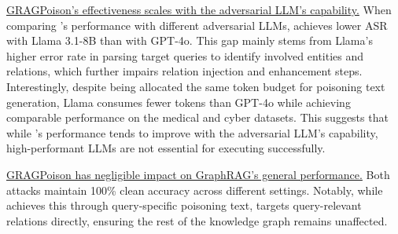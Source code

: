 


\vspace{2pt}
 \ul{GRAGPoison's effectiveness scales with the adversarial LLM's capability.}
When comparing \attack's performance with different adversarial LLMs, \attack achieves lower ASR with Llama 3.1-8B than with GPT-4o. This gap mainly stems from Llama's higher error rate in parsing target queries to identify involved entities and relations, which further impairs relation injection and enhancement steps. Interestingly, despite being allocated the same token budget for poisoning text generation, Llama consumes fewer tokens than GPT-4o while achieving comparable performance on the medical and cyber datasets. This suggests that while \attack's performance tends to improve with the adversarial LLM's capability, high-performant LLMs are not essential for executing \attack successfully. 


  \ul{GRAGPoison has negligible impact on GraphRAG's general performance.} 
 Both attacks maintain 100\% clean accuracy across different settings. Notably, while \prag achieves this through query-specific poisoning text, \attack targets query-relevant relations directly, ensuring the rest of the knowledge graph remains unaffected.

 




